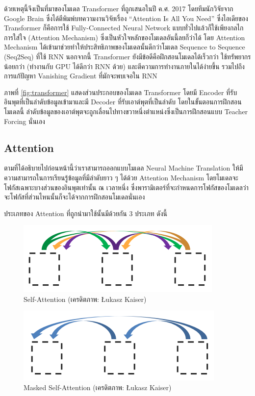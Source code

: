 ด้วยเหตุนี้จึงเป็นที่มาของโมเดล Transformer ที่ถูกเสนอในปี ค.ศ. 2017 โดยทีมนักวิจัยจาก Google Brain ซึ่งได้ตีพิมพ์บทความงานวิจัยเรื่อง \enquote{Attention Is All You Need}\autocite{vaswani2017a} ซึ่งไอเดียของ Transformer ก็คือการใช้ Fully-Connected Neural Network แบบทั่วไปแล้วก็ใช้เพียงกลไกการใส่ใจ (Attention Mechanism) ซึ่งเป็นหัวใจหลักของโมเดลอันนี้ลยก็ว่าได้ โดย Attention Mechanism ได้เข้ามาช่วยทำให้ประสิทธิภาพของโมเดลนั้นดีกว่าโมเดล Sequence to Sequence (Seq2Seq) ที่ใช้ RNN นอกจากนี้ Transformer ยังมีข้อดีคือฝึกสอนโมเดลได้เร็วกว่า ใช้ทรัพยากรน้อยกว่า (ทำงานกับ GPU ได้ดีกว่า RNN ด้วย) และตีความการทำงานภายในได้ง่ายขึ้น รวมไปถึงการแก้ปัญหา Vanishing Gradient ที่มักจะพบเจอใน RNN

ภาพที่ \ref{fig:transformer} แสดงส่วนประกอบของโมเดล Transformer โดยมี Encoder ที่รับอินพุตที่เป็นลำดับข้อมูลเข้ามาและมี Decoder ที่รับเอาต์พุตที่เป็นลำดับ โดยในขั้นตอนการฝึกสอนโมเดลนี้ ลำดับข้อมูลของเอาต์พุตจะถูกเลื่อนไปทางขวาหนึ่งตำแหน่งซึ่งเป็นการฝึกสอนแบบ Teacher Forcing นั่นเอง

\subsection{Attention}
\label{ssec:attention}

ตามที่ได้อธิบายไปก่อนหน้านี้ว่าเราสามารถออกแบบโมเดล Neural Machine Translation ให้มีความสามารถในการเรียนรู้ข้อมูลที่มีลำดับยาว ๆ ได้ด้วย Attention Mechanism โดยโมเดลจะโฟกัสเฉพาะบางส่วนของอินพุตเท่านั้น ณ เวลาหนึ่ง ซึ่งพารามิเตอร์ที่จะกำหนดการโฟกัสของโมเดลว่าจะโฟกัสที่ส่วนไหนนั้นก็จะได้จากการฝึกสอนโมเดลนั่นเอง

ประเภทของ Attention ที่ถูกนำมาใช้นั้นมีด้วยกัน 3 ประเภท ดังนี้

\begin{figure}[H]
    \centering
    \includegraphics[width=0.6\linewidth]{fig/attention_1_self.png}
    \caption{Self-Attention (เครดิตภาพ: Łukasz Kaiser)}
    \label{fig:self_attention}
\end{figure}

\begin{figure}[H]
    \centering
    \includegraphics[width=0.6\linewidth]{fig/attention_2_masked.png}
    \caption{Masked Self-Attention (เครดิตภาพ: Łukasz Kaiser)}
    \label{fig:masked_self_attention}
\end{figure}

